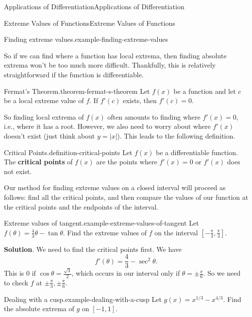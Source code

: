 \documentclass[10pt,]{book}
\newcommand{\terminology}[1]{\textbf{#1}}
\numberwithin{equation}{section}
\begin{document}
\begin{chapterptx}{Applications of Differentiation}{}{Applications of Differentiation}{}{}
\begin{sectionptx}{Extreme Values of Functions}{}{Extreme Values of Functions}{}{}
\begin{example}{Finding extreme values.}{example-finding-extreme-values}
\end{example}
\hypertarget{p-319}{}%
So if we can find where a function has local extrema, then finding absolute extrema won't be too much more difficult. Thankfully, this is relatively straightforward if the function is differentiable.%
\begin{theorem}{Fermat's Theorem.}{}{theorem-fermat-s-theorem}%
\hypertarget{p-320}{}%
Let \(f(x)\) be a function and let \(c\) be a local extreme value of \(f\). If \(f'(c)\) exists, then \(f'(c) = 0\).%
\end{theorem}
\hypertarget{p-321}{}%
So finding local extrema of \(f(x)\) often amounts to finding where \(f'(x) = 0\), i.e., where it has a root. However, we also need to worry about where \(f'(x)\) doesn't exist (just think about \(y = |x|\)). This leads to the following definition.%
\begin{definition}{Critical Points.}{definition-critical-points}%
\hypertarget{p-322}{}%
Let \(f(x)\) be a differentiable function. The \terminology{critical points} of \(f(x)\) are the points where \(f'(x) = 0\) or \(f'(x)\) does not exist.%
\end{definition}
\hypertarget{p-323}{}%
Our method for finding extreme values on a closed interval will proceed as follows: find all the critical points, and then compare the values of our function at the critical points and the endpoints of the interval.%
\begin{example}{Extreme values of tangent.}{example-extreme-values-of-tangent}%
\hypertarget{p-324}{}%
Let \(f(\theta) = \frac{4}{3}\theta - \tan\theta\). Find the extreme values of \(f\) on the interval \([-\frac{\pi}{3},\frac{\pi}{3}]\).%
\par\smallskip%
\noindent\textbf{Solution}.\hypertarget{solution-71}{}\quad%
\hypertarget{p-325}{}%
We need to find the critical points first. We have%
\begin{equation*}
f'(\theta) = \frac{4}{3} - \sec^{2}\theta.
\end{equation*}
This is \(0\) if \(\cos\theta = \frac{\sqrt{3}}{2}\), which occurs in our interval only if \(\theta = \pm\frac{\pi}{6}\). So we need to check \(f\) at \(\pm\frac{\pi}{3},\pm\frac{\pi}{6}\).%
\end{example}
\begin{example}{Dealing with a cusp.}{example-dealing-with-a-cusp}%
\hypertarget{p-326}{}%
Let \(g(x) = x^{1/3} - x^{4/3}\). Find the absolute extrema of \(g\) on \([-1,1]\).%
\par\smallskip%

\end{example}
\end{sectionptx}
\end{chapterptx}
\end{document}
